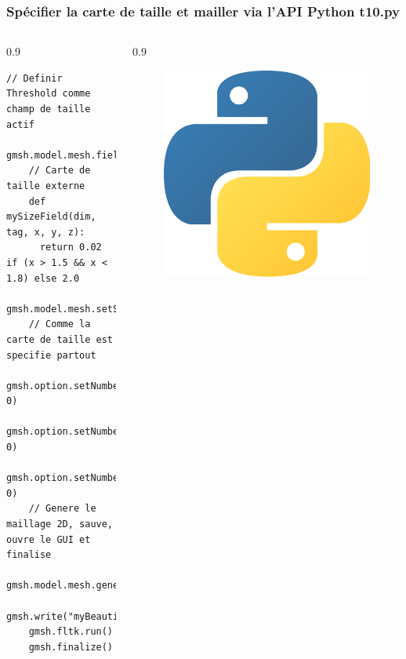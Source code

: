 \documentclass[aspectratio=169]{beamer}
\begin{document}
\begin{frame}[fragile]
\frametitle{Spécifier la carte de taille et mailler via l'API Python \hfill t10.py}
  \footnotesize
  \begin{columns}
    \begin{column}{0.9\linewidth}
    \begin{lstlisting}[frame=none, aboveskip=5mm]
    // Definir Threshold comme champ de taille actif
    gmsh.model.mesh.field.setAsBackgroundMesh(2)
    // Carte de taille externe
    def mySizeField(dim, tag, x, y, z):
      return 0.02 if (x > 1.5 && x < 1.8) else 2.0
    gmsh.model.mesh.setSizeCallback(mySizeField)
    // Comme la carte de taille est specifie partout
    gmsh.option.setNumber("Mesh.MeshSizeExtendFromBoundary", 0)
    gmsh.option.setNumber("Mesh.MeshSizeFromPoints", 0)
    gmsh.option.setNumber("Mesh.MeshSizeFromCurvature", 0)
    // Genere le maillage 2D, sauve, ouvre le GUI et finalise
    gmsh.model.mesh.generate(2)
    gmsh.write("myBeautifulMesh.msh")
    gmsh.fltk.run()
    gmsh.finalize()
    \end{lstlisting}
    \end{column}
    \begin{column}{0.9\linewidth}
      \begin{figure}
        \vspace{-5.5cm}
        \hspace{-8cm}
        \includegraphics[width=0.1\linewidth]{figures/py.png}
        \caption{}
        \label{}
      \end{figure}
    \end{column}
  \end{columns}
\end{frame}
\end{document}
